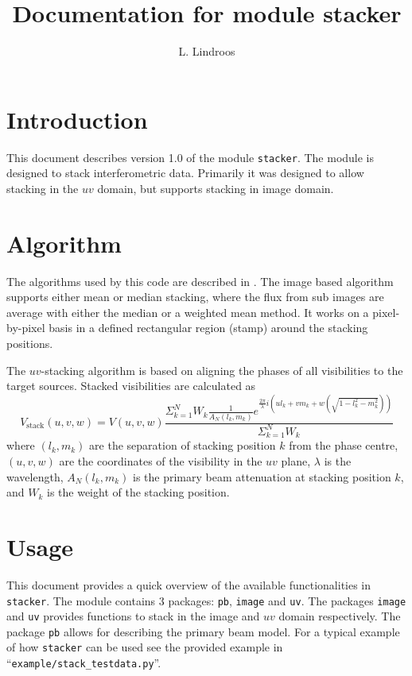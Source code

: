 \documentclass{article}
\title{Documentation for module stacker}
\author{L. Lindroos}
\begin{document}
\maketitle

\section{Introduction}
This document describes version 1.0 of the module {\tt stacker}.
The module is designed to stack interferometric data.
Primarily it was designed to allow stacking in the $uv$ domain, 
but supports stacking in image domain.

\section{Algorithm}
The algorithms used by this code are described in \cite{lindroos2014}.
The image based algorithm supports either mean or median stacking,
where the flux from sub images are average with either the median or a weighted mean method.
It works on a pixel-by-pixel basis in a defined rectangular region (stamp) around the stacking positions.

The $uv$-stacking algorithm is based on aligning the phases of all visibilities to the target sources.
Stacked visibilities are calculated as 
\begin{equation}
	V_\mathrm{stack}(u,v,w) = V(u,v,w) \frac{\Sigma_{k=1}^N W_k \frac{1}{A_N(l_k, m_k)} e^{\frac{2\pi}{\lambda} i \left( u l_k + v m_k + w(\sqrt{1-l_k^2-m_k^2})\right)} 
	}{\Sigma_{k=1}^N W_k}
	\label{eq:uvstack}
\end{equation}
where $(l_k, m_k)$ are the separation of stacking position $k$ from the phase centre,
$(u,v,w)$ are the coordinates of the visibility in the $uv$ plane,
$\lambda$ is the wavelength, 
$A_N(l_k, m_k)$ is the primary beam attenuation at stacking position $k$,
and $W_k$ is the weight of the stacking position.

\section{Usage}
This document provides a quick overview of the available functionalities in {\tt stacker}.
The module contains 3 packages: {\tt pb}, {\tt image} and {\tt uv}.
The packages {\tt image} and {\tt uv} provides functions to stack in the image and $uv$ domain respectively.
The package {\tt pb} allows for describing the primary beam model.
For a typical example of how {\tt stacker} can be used see the provided example in ``{\tt example/stack\_testdata.py}''.
\end{document}

